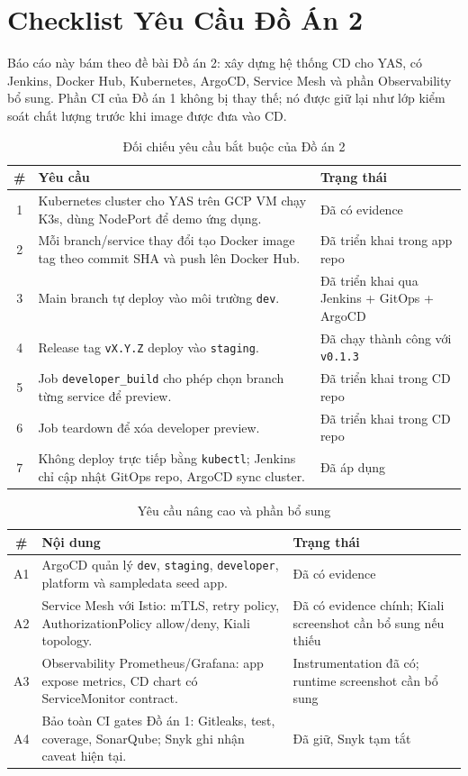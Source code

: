 \section{Checklist Yêu Cầu Đồ Án 2}

Báo cáo này bám theo đề bài Đồ án 2: xây dựng hệ thống CD cho YAS, có Jenkins,
Docker Hub, Kubernetes, ArgoCD, Service Mesh và phần Observability bổ sung. Phần
CI của Đồ án 1 không bị thay thế; nó được giữ lại như lớp kiểm soát chất lượng
trước khi image được đưa vào CD.

\begin{table}[H]
\centering
\caption{Đối chiếu yêu cầu bắt buộc của Đồ án 2}
\begin{tabular}{|c|p{9.5cm}|p{3cm}|}
\hline
\textbf{\#} & \textbf{Yêu cầu} & \textbf{Trạng thái} \\
\hline
1 & Kubernetes cluster cho YAS trên GCP VM chạy K3s, dùng NodePort để demo ứng dụng. & Đã có evidence \\
\hline
2 & Mỗi branch/service thay đổi tạo Docker image tag theo commit SHA và push lên Docker Hub. & Đã triển khai trong app repo \\
\hline
3 & Main branch tự deploy vào môi trường \texttt{dev}. & Đã triển khai qua Jenkins + GitOps + ArgoCD \\
\hline
4 & Release tag \texttt{vX.Y.Z} deploy vào \texttt{staging}. & Đã chạy thành công với \texttt{v0.1.3} \\
\hline
5 & Job \texttt{developer\_build} cho phép chọn branch từng service để preview. & Đã triển khai trong CD repo \\
\hline
6 & Job teardown để xóa developer preview. & Đã triển khai trong CD repo \\
\hline
7 & Không deploy trực tiếp bằng \texttt{kubectl}; Jenkins chỉ cập nhật GitOps repo, ArgoCD sync cluster. & Đã áp dụng \\
\hline
\end{tabular}
\end{table}

\begin{table}[H]
\centering
\caption{Yêu cầu nâng cao và phần bổ sung}
\begin{tabular}{|c|p{9.5cm}|p{3cm}|}
\hline
\textbf{\#} & \textbf{Nội dung} & \textbf{Trạng thái} \\
\hline
A1 & ArgoCD quản lý \texttt{dev}, \texttt{staging}, \texttt{developer}, platform và sampledata seed app. & Đã có evidence \\
\hline
A2 & Service Mesh với Istio: mTLS, retry policy, AuthorizationPolicy allow/deny, Kiali topology. & Đã có evidence chính; Kiali screenshot cần bổ sung nếu thiếu \\
\hline
A3 & Observability Prometheus/Grafana: app expose metrics, CD chart có ServiceMonitor contract. & Instrumentation đã có; runtime screenshot cần bổ sung \\
\hline
A4 & Bảo toàn CI gates Đồ án 1: Gitleaks, test, coverage, SonarQube; Snyk ghi nhận caveat hiện tại. & Đã giữ, Snyk tạm tắt \\
\hline
\end{tabular}
\end{table}

